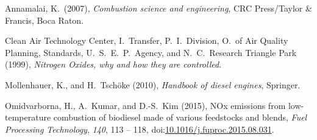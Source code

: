 \documentclass[9pt]{report}
\begin{document}
{\mdsupressbiblabel{}\begin{thebibliography}{4}%
\label{sec-bibliography}%

\mdbibitemlabel{}Annamalai, K.~(2007), \emph{Combustion science and engineering}, CRC Press/Taylor \& Francis, Boca Raton.\label{annamalai2007combustion}%

\mdbibitemlabel{}Clean Air Technology Center, I.~Transfer, P.~I.~Division, O.~of Air Quality Planning, Standards, U.~S.~E.~P.~Agency, and N.~C.~Research Triangle Park (1999), \emph{Nitrogen Oxides, why and how they are controlled}.\label{epabulletin}%

\mdbibitemlabel{}Mollenhauer, K., and H.~Tschöke (2010), \emph{Handbook of diesel engines}, Springer.\label{mollenhauer2010handbook}%

\mdbibitemlabel{}Omidvarborna, H., A.~Kumar, and D.-S.~Kim (2015), NOx emissions from low-temperature combustion of biodiesel made of various feedstocks and blends, \emph{Fuel Processing Technology}, \emph{140}, 113 – 118, doi:\href{https://dx.doi.org/10.1016/j.fuproc.2015.08.031}{10.1016/j.fuproc.2015.08.031}.\label{omidvarborna2015113}%
\par%
\end{thebibliography}}%
\end{document}
